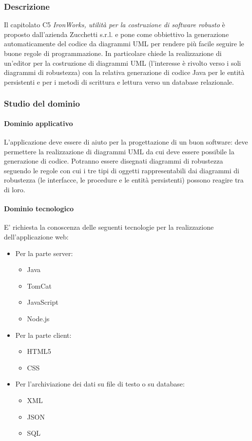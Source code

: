 		\subsubsection{Descrizione}
		Il capitolato C5 \emph{IronWorks, utilità per la costruzione di software robusto} è proposto dall'azienda Zucchetti s.r.l. e pone come obbiettivo la generazione automaticamente del codice da diagrammi UML per rendere più facile seguire le buone regole di programmazione. In particolare chiede la realizzazione di un'editor per la costruzione di diagrammi UML (l'interesse è rivolto verso i soli diagrammi di robustezza) con la relativa generazione di codice Java per le entità persistenti e per i metodi di scrittura e lettura verso un database relazionale. 
		\subsubsection{Studio del dominio}
			\paragraph{Dominio applicativo} \Spazio
			L'applicazione deve essere di aiuto per la progettazione di un buon software: deve permettere la realizzazione di diagrammi UML da cui deve essere possibile la generazione di codice. Potranno essere disegnati diagrammi di robustezza seguendo le regole con cui i tre tipi di oggetti rappresentabili dai diagrammi di robustezza (le interfacce, le procedure e le entità persistenti) possono reagire tra di loro.
			\paragraph{Dominio tecnologico} \Spazio
			E' richiesta la conoscenza delle seguenti tecnologie per la realizzazione dell'applicazione web:
				\begin{itemize}
					\item Per la parte server:
					\begin{itemize}
						\item Java
						\item TomCat
						\item JavaScript
						\item Node.js
					\end{itemize}
					\item Per la parte client:
					\begin{itemize}
						\item HTML5
						\item CSS
					\end{itemize}
					\item Per l'archiviazione dei dati su file di testo o su database:
					\begin{itemize}
						\item XML
						\item JSON
						\item SQL
					\end{itemize}
				\end{itemize}
